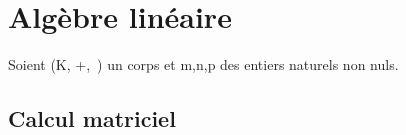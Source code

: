 
\section{Algèbre linéaire}

\vspace{0.4cm}

\begin{center}
    Soient (K, +,\ \x) un corps et m,n,p des entiers naturels non nuls.
\end{center}

\vspace{0.4cm}

\subsection{Calcul matriciel}

\vspace{0.5cm}

